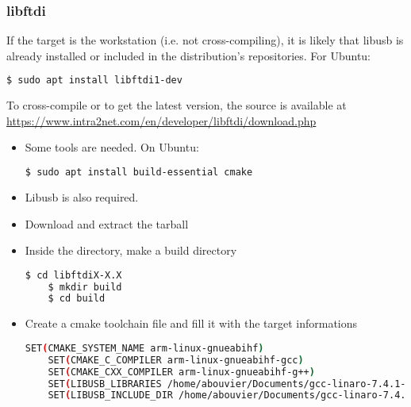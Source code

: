 \documentclass{article}
\begin{document}
    \subsubsection{libftdi}
    
    If the target is the workstation (i.e. not cross-compiling), it is likely that libusb is already installed or included in the distribution's repositories. For Ubuntu:
    \begin{lstlisting}[language=bash]
    $ sudo apt install libftdi1-dev
    \end{lstlisting}
    
	To cross-compile or to get the latest version, the source is available at \url{https://www.intra2net.com/en/developer/libftdi/download.php}
    
    \begin{itemize}
    
	\item Some tools are needed. On Ubuntu:
	
	\begin{lstlisting}[language=bash]
    $ sudo apt install build-essential cmake
    \end{lstlisting}
    
    \item Libusb is also required.
    
    \item Download and extract the tarball
    
    \item Inside the directory, make a build directory
    
    \begin{lstlisting}[language=bash]
    $ cd libftdiX-X.X
    $ mkdir build
    $ cd build
    \end{lstlisting}
    
    \item Create a cmake toolchain file and fill it with the target informations
    
    \begin{lstlisting}[language=bash, title=toolchain-arm-linux-gnueabihf.cmake]
    SET(CMAKE_SYSTEM_NAME arm-linux-gnueabihf)
    SET(CMAKE_C_COMPILER arm-linux-gnueabihf-gcc)
    SET(CMAKE_CXX_COMPILER arm-linux-gnueabihf-g++)
    SET(LIBUSB_LIBRARIES /home/abouvier/Documents/gcc-linaro-7.4.1-2019.02-x86_64_arm-linux-gnueabihf/lib/libusb-1.0.so.0)
    SET(LIBUSB_INCLUDE_DIR /home/abouvier/Documents/gcc-linaro-7.4.1-2019.02-x86_64_arm-linux-gnueabihf/include/libusb-1.0)
    \end{lstlisting}
    

\end{itemize}
\end{document}
